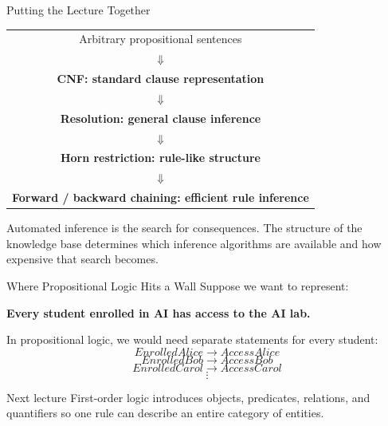 \documentclass[aspectratio=169,10pt]{beamer}
\begin{document}
\begin{frame}[shrink=8]{Putting the Lecture Together}
  \begin{center}
    \begin{tabular}{c}
      Arbitrary propositional sentences \\
      $\Downarrow$ \\
      \textbf{CNF: standard clause representation} \\
      $\Downarrow$ \\
      \textbf{Resolution: general clause inference} \\
      $\Downarrow$ \\
      \textbf{Horn restriction: rule-like structure} \\
      $\Downarrow$ \\
      \textbf{Forward / backward chaining: efficient rule inference}
    \end{tabular}
  \end{center}

  \begin{keyidea}
    Automated inference is the search for consequences. The structure of the knowledge base determines which inference algorithms are available and how expensive that search becomes.
  \end{keyidea}
\end{frame}

\begin{frame}[shrink=8]{Where Propositional Logic Hits a Wall}
  Suppose we want to represent:

  \begin{center}
    \textbf{Every student enrolled in AI has access to the AI lab.}
  \end{center}

  In propositional logic, we would need separate statements for every student:
  \[
    EnrolledAlice \rightarrow AccessAlice
  \]
  \[
    EnrolledBob \rightarrow AccessBob
  \]
  \[
    EnrolledCarol \rightarrow AccessCarol
  \]
  \[
    \vdots
  \]

  \begin{block}{Next lecture}
    First-order logic introduces objects, predicates, relations, and quantifiers so one rule can describe an entire category of entities.
  \end{block}
\end{frame}
\end{document}
